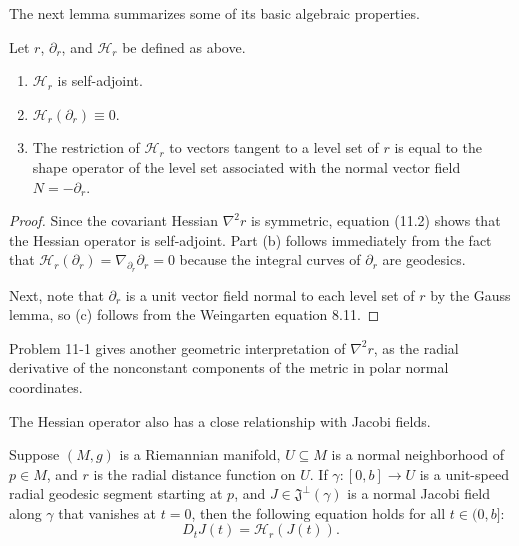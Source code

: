 The next lemma summarizes some of its basic algebraic properties.

\begin{lemma}
\label{lem:hessian-operator-properties}
Let $r$, $\partial_r$, and $\mathcal{H}_r$ be defined as above.
\begin{enumerate}[label=\textup{(\alph*)}]
\item $\mathcal{H}_r$ is self-adjoint.
\item $\mathcal{H}_r(\partial_r) \equiv 0$.
\item The restriction of $\mathcal{H}_r$ to vectors tangent to a level set of $r$ is equal to the shape operator of the level set associated with the normal vector field $N = -\partial_r$.
\end{enumerate}

\begin{proof}
Since the covariant Hessian $\nabla^2 r$ is symmetric, equation (11.2) shows that the Hessian operator is self-adjoint. Part (b) follows immediately from the fact that $\mathcal{H}_r(\partial_r) = \nabla_{\partial_r} \partial_r = 0$ because the integral curves of $\partial_r$ are geodesics.

Next, note that $\partial_r$ is a unit vector field normal to each level set of $r$ by the Gauss lemma, so (c) follows from the Weingarten equation 8.11.
\end{proof}
\end{lemma}

Problem 11-1 gives another geometric interpretation of $\nabla^2 r$, as the radial derivative of the nonconstant components of the metric in polar normal coordinates.

The Hessian operator also has a close relationship with Jacobi fields.

\begin{proposition}[]
\label{prop:jacobi-field-hessian-equation}
Suppose $(M, g)$ is a Riemannian manifold, $U \subseteq M$ is a normal neighborhood of $p \in M$, and $r$ is the radial distance function on $U$. If $\gamma : [0, b] \to U$ is a unit-speed radial geodesic segment starting at $p$, and $J \in \mathfrak{J}^{\perp}(\gamma)$ is a normal Jacobi field along $\gamma$ that vanishes at $t = 0$, then the following equation holds for all $t \in (0, b]$:
\begin{equation}
D_t J(t) = \mathcal{H}_r(J(t)).
\tag{11.3}
\end{equation}
\end{proposition}


